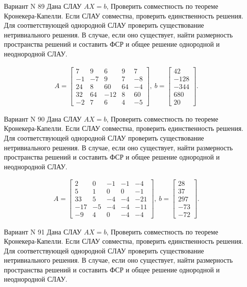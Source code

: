 \documentclass[11pt]{report}
\begin{document}
Вариант N 89
Дана СЛАУ $AX = b$,
Проверить совместность по теореме Кронекера-Капелли. Если СЛАУ совместна, проверить единственность решения.
Для соответствующей однородной СЛАУ проверить существование нетривиального решения. В случае, если оно существует,
найти размерность пространства решений и составить ФСР и общее решение однородной  и неоднородной СЛАУ.


\begin{align*}
 A = \left[\begin{matrix}7 & 9 & 6 & 9 & 7\\-1 & -7 & 9 & 7 & -8\\24 & 8 & 60 & 64 & -4\\32 & 64 & -12 & 8 & 60\\-2 & 7 & 6 & 4 & -5\end{matrix}\right],
\ b = \left[\begin{matrix}42\\-128\\-344\\680\\20\end{matrix}\right]. 
 \end{align*}

Вариант N 90
Дана СЛАУ $AX = b$,
Проверить совместность по теореме Кронекера-Капелли. Если СЛАУ совместна, проверить единственность решения.
Для соответствующей однородной СЛАУ проверить существование нетривиального решения. В случае, если оно существует,
найти размерность пространства решений и составить ФСР и общее решение однородной  и неоднородной СЛАУ.


\begin{align*}
 A = \left[\begin{matrix}2 & 0 & -1 & -1 & -4\\5 & 1 & 0 & 0 & -1\\33 & 5 & -4 & -4 & -21\\-17 & -5 & -4 & -4 & -11\\-9 & 4 & 0 & -4 & -4\end{matrix}\right],
\ b = \left[\begin{matrix}28\\37\\297\\-73\\-72\end{matrix}\right]. 
 \end{align*}

Вариант N 91
Дана СЛАУ $AX = b$,
Проверить совместность по теореме Кронекера-Капелли. Если СЛАУ совместна, проверить единственность решения.
Для соответствующей однородной СЛАУ проверить существование нетривиального решения. В случае, если оно существует,
найти размерность пространства решений и составить ФСР и общее решение однородной  и неоднородной СЛАУ.
\end{document}
